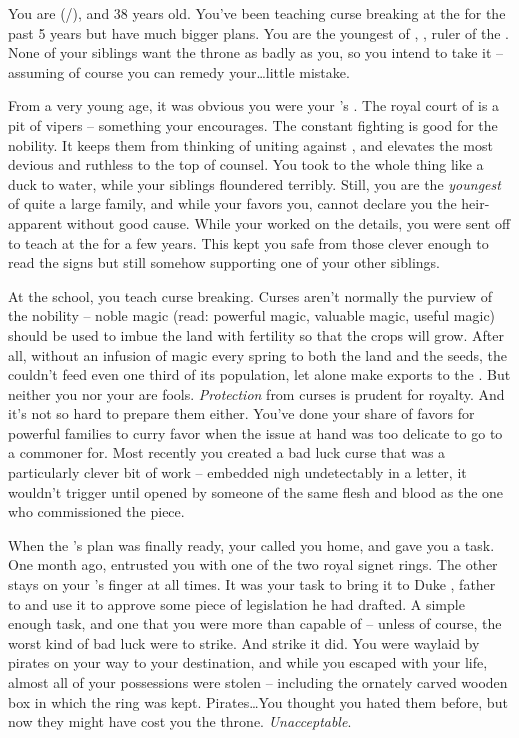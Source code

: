 \documentclass[char]{GL2020}
\begin{document}
\name{\cPrince{}}

You are \cPrince{} (\cPrince{\they}/\cPrince{\them}), and 38 years old. You’ve been teaching curse breaking at the \pSchool{} for the past 5 years but have much bigger plans. You are the youngest \cPrince{\child} of \cQueen{\Majesty}, \cQueen{}, ruler of the \pFarm{}. None of your siblings want the throne as badly as you, so you intend to take it -- assuming of course you can remedy your\ldots little mistake.

From a very young age, it was obvious you were your \cQueen{\parent}’s \cPrince{\child}. The royal court of \pFarm{} is a pit of vipers -- something your \cQueen{\parent} encourages. The constant fighting is good for the nobility. It keeps them from thinking of uniting against \cQueen{\them}, and elevates the most devious and ruthless to the top of \cQueen{\their} counsel. You took to the whole thing like a duck to water, while your siblings floundered terribly.  Still, you are the \emph{youngest} of quite a large family, and while your \cQueen{\parent} favors you, \cQueen{\they} cannot declare you the heir-apparent without good cause. While your \cQueen{\parent} worked on the details, you were sent off to teach at the \pSchool{} for a few years. This kept you safe from those clever enough to read the signs but still somehow supporting one of your other siblings. 

At the school, you teach curse breaking. Curses aren’t normally the purview of the nobility -- noble magic (read: powerful magic, valuable magic, useful magic) should be used to imbue the land with fertility so that the crops will grow. After all, without an infusion of magic every spring to both the land and the seeds, the \pFarm{} couldn’t feed even one third of its population, let alone make exports to the \pTech{}. But neither you nor your \cQueen{\parent} are fools. \emph{Protection} from curses is prudent for royalty. And it’s not so hard to prepare them either. You’ve done your share of favors for powerful families to curry favor when the issue at hand was too delicate to go to a commoner for. Most recently you created a bad luck curse that was a particularly clever bit of work -- embedded nigh undetectably in a letter, it wouldn’t trigger until opened by someone of the same flesh and blood as the one who commissioned the piece.

When the \cQueen{\Majesty}’s plan was finally ready, your \cQueen{\parent} called you home, and gave you a task. One month ago, \cQueen{\They} entrusted you with one of the two royal signet rings. The other stays on your \cQueen{\parent}’s finger at all times. It was your task to bring it to Duke \cChupStudent{\formal}, father to \cChupStudent{} and use it to approve some piece of legislation he had drafted. A simple enough task, and one that you were more than capable of -- unless of course, the worst kind of bad luck were to strike. And strike it did. You were waylaid by pirates on your way to your destination, and while you escaped with your life, almost all of your possessions were stolen -- including the ornately carved wooden box in which the ring was kept. Pirates\ldots You thought you hated them before, but now they might have cost you the throne. \emph{Unacceptable}.
\end{document}
